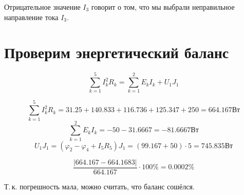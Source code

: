 \documentclass[a4paper,10pt,notitlepage,pdftex,headsepline]{scrartcl}
\begin{document}
Отрицательное значение $I_3$ говорит о том, что мы выбрали неправильное направление тока $I_3$.

\section{Проверим энергетический баланс}

$$\sum\limits_{k=1}^5 I_k^2 R_k = \sum\limits_{k=1}^2 E_k I_k + U_1 J_1$$

$$\sum\limits_{k=1}^5 I_k^2 R_k = 31.25 + 140.833 + 116.736 + 125.347 + 250 = 664.167 \text{Вт}$$
$$\sum\limits_{k=1}^2 E_k I_k = -50 - 31.6667 = -81.6667 \text{Вт}$$
$$U_1 J_1 = \left(\varphi_2 - \varphi_4 + I_5 R_5\right) J_1 = \left( 99.167 + 50 \right) \cdot 5 = 745.835 \text{Вт}$$

$$\frac{\left|664.167-664.1683\right|}{664.167} \cdot 100\% = 0.0002\%$$

Т.\,к. погрешность мала, можно считать, что баланс сошёлся.
\end{document}
